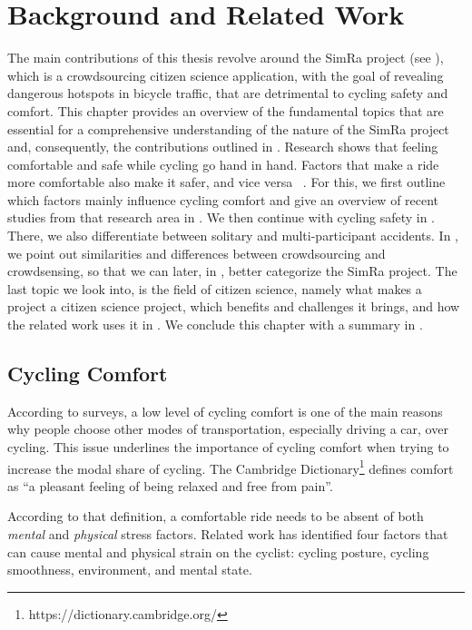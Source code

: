 \cleardoublepage
\chapter{Background and Related Work}
\label{cha:background}
The main contributions of this thesis revolve around the SimRa project (see ), which is a crowdsourcing citizen science application, with the goal of revealing dangerous hotspots in bicycle traffic, that are detrimental to cycling safety and comfort.
This chapter provides an overview of the fundamental topics that are essential for a comprehensive understanding of the nature of the SimRa project and, consequently, the contributions outlined in .
Research shows that feeling comfortable and safe while cycling go hand in hand.
Factors that make a ride more comfortable also make it safer, and vice versa ~\cite{shoman2023evaluation, fitch2018relationship}.
For this, we first outline which factors mainly influence cycling comfort and give an overview of recent studies from that research area in .
We then continue with cycling safety in .
There, we also differentiate between solitary and multi-participant accidents.
In , we point out similarities and differences between crowdsourcing and crowdsensing, so that we can later, in , better categorize the SimRa project.
The last topic we look into, is the field of citizen science, namely what makes a project a citizen science project, which benefits and challenges it brings, and how the related work uses it in .
We conclude this chapter with a summary in .

\section{Cycling Comfort}
\label{sec:cycling_comfort_background}
According to surveys, a low level of cycling comfort is one of the main reasons why people choose other modes of transportation, especially driving a car, over cycling.
This issue underlines the importance of cycling comfort when trying to increase the modal share of cycling.
The Cambridge Dictionary\footnote{https://dictionary.cambridge.org/} defines comfort as
``a pleasant feeling of being relaxed and free from pain''.

According to that definition, a comfortable ride needs to be absent of both \textit{mental} and \textit{physical} stress factors.
Related work has identified four factors that can cause mental and physical strain on the cyclist: cycling posture, cycling smoothness, environment, and mental state.

